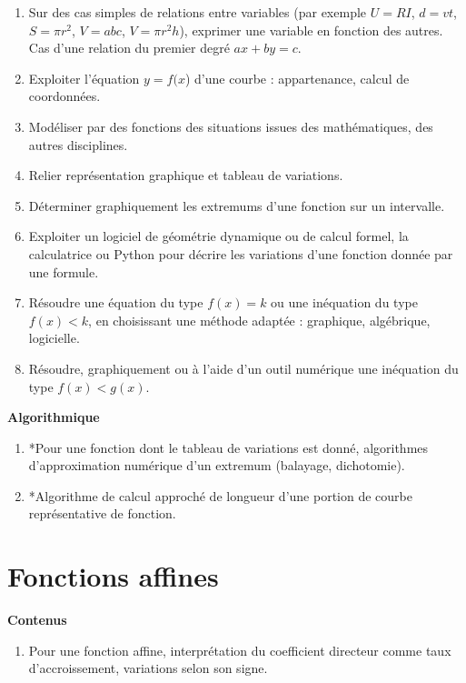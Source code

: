 \documentclass[10pt,a4paper]{article}
\begin{document}
\begin{enumerate}
\item Sur des cas simples de relations entre variables (par exemple $U = RI$, $d = vt$, $S = \pi r^2$, $V = abc$, $V = \pi r^2h$), exprimer une variable en fonction des autres. Cas d’une relation du premier degré $ax + by = c$. 
\item Exploiter l'équation $y = f(x$) d'une courbe : appartenance, calcul de coordonnées.
\item Modéliser par des fonctions des situations issues des mathématiques, des autres disciplines.
\item Relier représentation graphique et tableau de variations.
\item Déterminer graphiquement les extremums d'une fonction sur un intervalle.
\item Exploiter un logiciel de géométrie dynamique ou de calcul formel, la calculatrice ou Python pour décrire les variations d'une fonction donnée par une formule.
\item  Résoudre une équation du type $f(x) = k$ ou une inéquation du type $f(x) < k$, en choisissant une méthode adaptée : graphique, algébrique, logicielle.
\item  Résoudre, graphiquement ou à l'aide d'un outil numérique une inéquation du type $f(x) < g(x)$.

\end{enumerate}
 
 
 
\textbf{Algorithmique}

\begin{enumerate}
\item *Pour une fonction dont le tableau de variations est donné, algorithmes d'approximation numérique d'un extremum (balayage, dichotomie).
\item *Algorithme de calcul approché de longueur d'une portion de courbe représentative de fonction.
\end{enumerate}


\section{Fonctions affines}

\textbf{Contenus}

\begin{enumerate}
\item Pour une fonction affine, interprétation du coefficient directeur comme taux d'accroissement, variations
selon son signe.
\end{enumerate}
\end{document}
